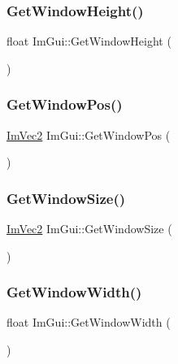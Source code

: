 \subsubsection{\texorpdfstring{Get\+Window\+Height()}{GetWindowHeight()}}
{\footnotesize\ttfamily float Im\+Gui\+::\+Get\+Window\+Height (\begin{DoxyParamCaption}{ }\end{DoxyParamCaption})}

\mbox{\label{namespace_im_gui_a413d939f3ef416a47d6e5b48be955146}} 
\subsubsection{\texorpdfstring{Get\+Window\+Pos()}{GetWindowPos()}}
{\footnotesize\ttfamily \mbox{\hyperlink{struct_im_vec2}{Im\+Vec2}} Im\+Gui\+::\+Get\+Window\+Pos (\begin{DoxyParamCaption}{ }\end{DoxyParamCaption})}

\mbox{\label{namespace_im_gui_aaa5c0bfac7125ba9850a08b6db2e90c9}} 
\subsubsection{\texorpdfstring{Get\+Window\+Size()}{GetWindowSize()}}
{\footnotesize\ttfamily \mbox{\hyperlink{struct_im_vec2}{Im\+Vec2}} Im\+Gui\+::\+Get\+Window\+Size (\begin{DoxyParamCaption}{ }\end{DoxyParamCaption})}

\mbox{\label{namespace_im_gui_a471ff23945b99541c506dbdc2a9004cf}} 
\subsubsection{\texorpdfstring{Get\+Window\+Width()}{GetWindowWidth()}}
{\footnotesize\ttfamily float Im\+Gui\+::\+Get\+Window\+Width (\begin{DoxyParamCaption}{ }\end{DoxyParamCaption})}

